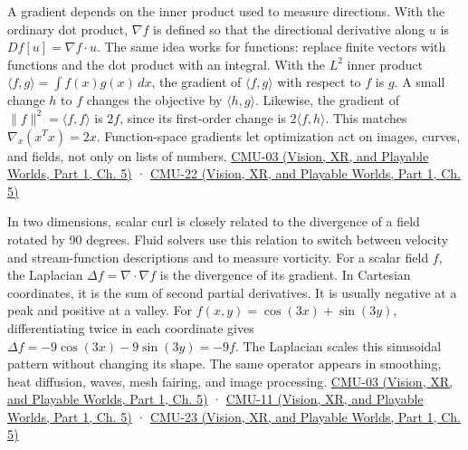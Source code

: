 \hypertarget{03-visual-computing-i-ch001-coordinate-free-products-and-the-meaning-of-second-derivatives}{}

A gradient depends on the inner product used to measure directions. With the ordinary dot product, \(\nabla f\) is defined so that the directional derivative along \(u\) is \(Df[u]=\nabla f\cdot u\). The same idea works for functions: replace finite vectors with functions and the dot product with an integral. With the \(L^2\) inner product \(\langle f,g\rangle=\int f(x)g(x)\,dx\), the gradient of \(\langle f,g\rangle\) with respect to \(f\) is \(g\). A small change \(h\) to \(f\) changes the objective by \(\langle h,g\rangle\). Likewise, the gradient of \(\|f\|^2=\langle f,f\rangle\) is \(2f\), since its first-order change is \(2\langle f,h\rangle\). This matches \(\nabla_x(x^Tx)=2x\). Function-space gradients let optimization act on images, curves, and fields, not only on lists of numbers. \href{../07-Vision-XR-and-Playable-Worlds-P01/main.pdf\#nameddest=04-visual-computing-ii-ch036-cmu-03---vector-calculus-preview}{CMU-03 (Vision, XR, and Playable Worlds, Part 1, Ch. 5)} · \href{../07-Vision-XR-and-Playable-Worlds-P01/main.pdf\#nameddest=04-visual-computing-ii-ch036-cmu-22---optimization}{CMU-22 (Vision, XR, and Playable Worlds, Part 1, Ch. 5)}

In two dimensions, scalar curl is closely related to the divergence of a field rotated by 90 degrees. Fluid solvers use this relation to switch between velocity and stream-function descriptions and to measure vorticity. For a scalar field \(f\), the Laplacian \(\Delta f=\nabla\cdot\nabla f\) is the divergence of its gradient. In Cartesian coordinates, it is the sum of second partial derivatives. It is usually negative at a peak and positive at a valley. For \(f(x,y)=\cos(3x)+\sin(3y)\), differentiating twice in each coordinate gives \(\Delta f=-9\cos(3x)-9\sin(3y)=-9f\). The Laplacian scales this sinusoidal pattern without changing its shape. The same operator appears in smoothing, heat diffusion, waves, mesh fairing, and image processing. \href{../07-Vision-XR-and-Playable-Worlds-P01/main.pdf\#nameddest=04-visual-computing-ii-ch036-cmu-03---vector-calculus-preview}{CMU-03 (Vision, XR, and Playable Worlds, Part 1, Ch. 5)} · \href{../07-Vision-XR-and-Playable-Worlds-P01/main.pdf\#nameddest=04-visual-computing-ii-ch036-cmu-11---digital-geometry-processing}{CMU-11 (Vision, XR, and Playable Worlds, Part 1, Ch. 5)} · \href{../07-Vision-XR-and-Playable-Worlds-P01/main.pdf\#nameddest=04-visual-computing-ii-ch036-cmu-23---physically-based-animation-and-pdes}{CMU-23 (Vision, XR, and Playable Worlds, Part 1, Ch. 5)}

